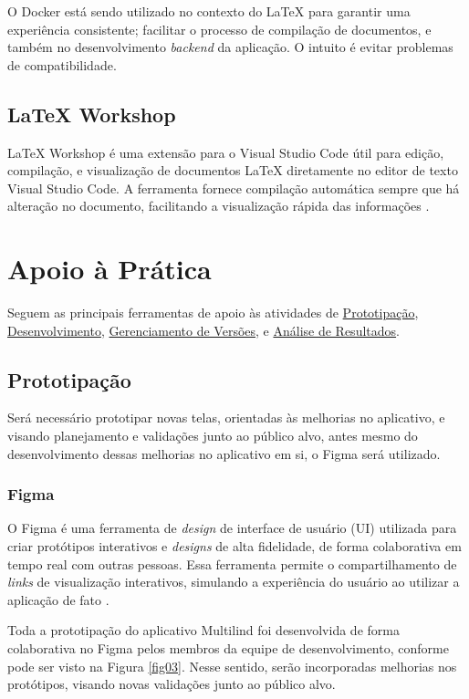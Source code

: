 O Docker está sendo utilizado no contexto do LaTeX para garantir uma experiência consistente; facilitar o 
processo de compilação de documentos, e também no desenvolvimento \textit{backend} da aplicação. O intuito é evitar problemas 
de compatibilidade.

\subsection{LaTeX Workshop}
\label{sec:LaTeX Workshop}
LaTeX Workshop é uma extensão para o Visual Studio Code útil para edição, compilação, e visualização de 
documentos LaTeX diretamente no editor de texto Visual Studio Code. A ferramenta fornece compilação 
automática sempre que há alteração no documento, facilitando a visualização rápida das informações \cite{latexworkshop}.

\section{Apoio à Prática}
\label{sec:Apoio à Prática}
Seguem as principais ferramentas de apoio às atividades de \hyperref[sec:Prototipacao]{Prototipação}, \hyperref[sec:Desenvolvimento]{Desenvolvimento}, 
\hyperref[sec:Gerenciamento de Versoes]{Gerenciamento de Versões}, e \hyperref[sec:Análise de Resultados]{Análise de Resultados}.

\subsection{Prototipação}
\label{sec:Prototipacao}
Será necessário prototipar novas telas, orientadas às melhorias no aplicativo, e visando planejamento e validações 
junto ao público alvo, antes mesmo do desenvolvimento dessas melhorias no aplicativo em si, o Figma 
será utilizado.

\subsubsection{Figma}
\label{sec:Figma}
O Figma é uma ferramenta de \textit{design} de interface de usuário (UI) utilizada para criar protótipos interativos e \textit{designs} de alta fidelidade, de forma  
colaborativa em tempo real com outras pessoas. Essa ferramenta permite o compartilhamento de \textit{links} de visualização interativos, simulando a experiência 
do usuário ao utilizar a aplicação de fato \cite{figma}.

Toda a prototipação do aplicativo Multilind foi desenvolvida de forma colaborativa no Figma pelos membros da equipe de desenvolvimento, conforme pode ser visto 
na Figura \ref{fig03}. Nesse sentido, serão incorporadas melhorias nos protótipos, visando novas validações junto ao público alvo.  

